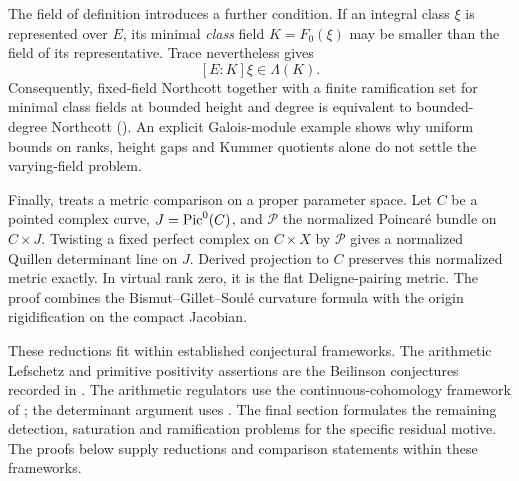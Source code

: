 \documentclass[11pt,a4paper]{article}
\theoremstyle{definition}
\DeclareRobustCommand{\MathSecref}[1]{\begingroup\hypersetup{linkcolor=MathSectionLink}\Cref{#1}\endgroup}
\newcommand{\cP}{\mathcal P}\newcommand{\cO}{\mathcal O}
\numberwithin{equation}{section}
\begin{document}
The field of definition introduces a further condition. If an
integral class \(\xi\) is represented over \(E\), its minimal
\emph{class} field \(K=F_0(\xi)\) may be smaller than the field of
its representative. Trace nevertheless gives
\[
 [E:K]\xi\in\Lambda(K).
\]
Consequently, fixed-field Northcott together with a finite
ramification set for minimal class fields at bounded height and
degree is equivalent to bounded-degree Northcott
(\MathSecref{sec:ramification-proof}). An explicit Galois-module
example shows why uniform bounds on ranks, height gaps and Kummer
quotients alone do not settle the varying-field problem.

Finally, \MathSecref{sec:metrics} treats a metric comparison on a
proper parameter space. Let \(C\) be a pointed complex curve,
\(J=\operatorname{Pic}^0(C)\), and \(\cP\) the normalized Poincaré bundle on
\(C\times J\). Twisting a fixed perfect complex on \(C\times X\)
by \(\cP\) gives a normalized Quillen determinant line on \(J\).
Derived projection to \(C\) preserves this normalized metric
exactly. In virtual rank zero, it is the flat Deligne-pairing
metric. The proof combines the Bismut--Gillet--Soulé curvature
formula with the origin rigidification on the compact Jacobian.

These reductions fit within established conjectural frameworks.
The arithmetic Lefschetz and primitive positivity assertions are
the Beilinson conjectures recorded in
\cite[Conjecture~2.3.1]{ZhangStandard}. The arithmetic regulators use
the continuous-cohomology framework of
\cite{Raskind,Kahn}; the determinant argument uses
\cite{BGS,BiswasSchumacher}. The final section formulates the
remaining detection, saturation and ramification problems for the
specific residual motive. The proofs below supply reductions and
comparison statements within these frameworks.










\end{document}
